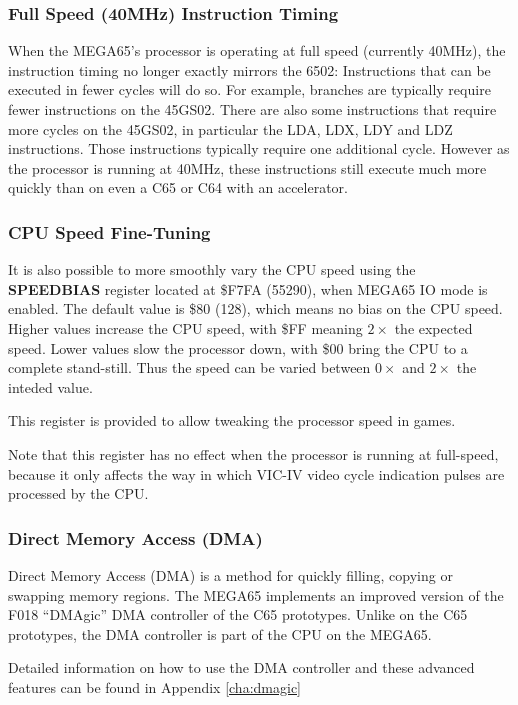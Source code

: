 \subsubsection{Full Speed (40MHz) Instruction Timing}

When the MEGA65's processor is operating at full speed
(currently 40MHz), the instruction
timing no longer exactly mirrors the 6502: Instructions that can be
executed in fewer cycles
will do so. For example, branches are typically require fewer instructions on the 45GS02.
There are also some instructions that require more cycles on the 45GS02, in particular the
LDA, LDX, LDY and LDZ instructions. Those instructions typically require one additional cycle.
However as the processor is running at 40MHz, these instructions still execute much more quickly
than on even a C65 or C64 with an accelerator.

\subsubsection{CPU Speed Fine-Tuning}
It is also possible to more smoothly
vary the CPU speed using the {\bf SPEEDBIAS} register located at \$F7FA (55290), when MEGA65 IO mode
is enabled.  The default value is \$80 (128), which means no bias on the CPU speed.  Higher values
increase the CPU speed, with \$FF meaning $2\times$ the expected speed. Lower values slow
the processor down, with \$00 bring the CPU to a complete stand-still.  Thus the speed can be
varied between $0\times$ and $2\times$ the inteded value.

This register is provided to allow tweaking the processor speed in games.

Note that this register has no effect when
the processor is running at full-speed, because it only affects the way in which VIC-IV
video cycle indication pulses are processed by the CPU.

\subsubsection{Direct Memory Access (DMA)}
Direct Memory Access (DMA) is a method for quickly filling, copying or swapping memory regions.
The MEGA65 implements an improved version of the F018 ``DMAgic'' DMA controller of the C65 prototypes.
 Unlike on the C65 prototypes, the DMA controller is part of the CPU on the MEGA65.

Detailed information on how to use the DMA controller and these advanced features can be found in Appendix \ref{cha:dmagic}

